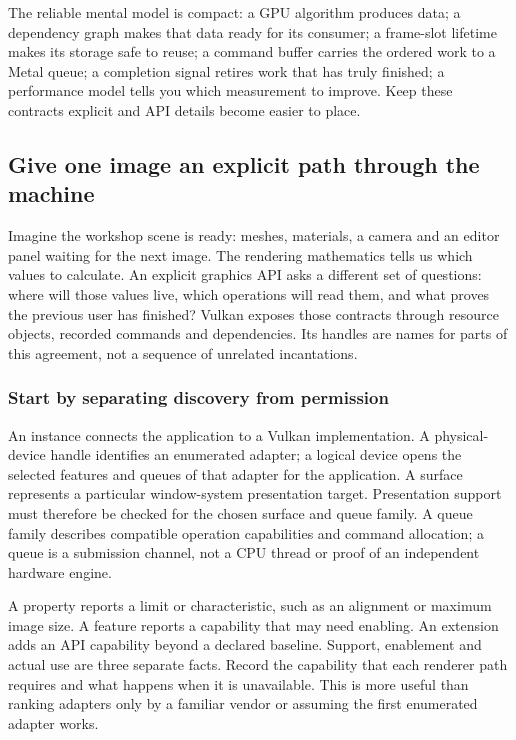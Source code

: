 The reliable mental model is compact: a GPU algorithm produces data; a dependency graph makes that data ready for its consumer; a frame-slot lifetime makes its storage safe to reuse; a command buffer carries the ordered work to a Metal queue; a completion signal retires work that has truly finished; a performance model tells you which measurement to improve. Keep these contracts explicit and API details become easier to place.

\subsection{Give one image an explicit path through the machine}\label{give-one-image-an-explicit-path-through-the-machine}

Imagine the workshop scene is ready: meshes, materials, a camera and an editor panel waiting for the next image. The rendering mathematics tells us which values to calculate. An explicit graphics API asks a different set of questions: where will those values live, which operations will read them, and what proves the previous user has finished? Vulkan exposes those contracts through resource objects, recorded commands and dependencies. Its handles are names for parts of this agreement, not a sequence of unrelated incantations.

\subsubsection{Start by separating discovery from permission}\label{start-by-separating-discovery-from-permission}

An instance connects the application to a Vulkan implementation. A physical-device handle identifies an enumerated adapter; a logical device opens the selected features and queues of that adapter for the application. A surface represents a particular window-system presentation target. Presentation support must therefore be checked for the chosen surface and queue family. A queue family describes compatible operation capabilities and command allocation; a queue is a submission channel, not a CPU thread or proof of an independent hardware engine.

A property reports a limit or characteristic, such as an alignment or maximum image size. A feature reports a capability that may need enabling. An extension adds an API capability beyond a declared baseline. Support, enablement and actual use are three separate facts. Record the capability that each renderer path requires and what happens when it is unavailable. This is more useful than ranking adapters only by a familiar vendor or assuming the first enumerated adapter works.

